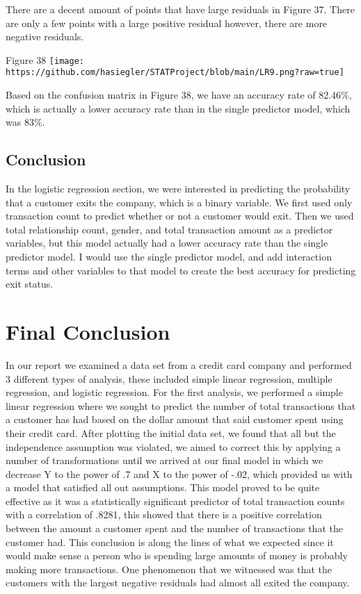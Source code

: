 \documentclass[
]{article}
\begin{document}
There are a decent amount of points that have large residuals in Figure
37. There are only a few points with a large positive residual however,
there are more negative residuals.

Figure 38
\texttt{[image: https://github.com/hasiegler/STATProject/blob/main/LR9.png?raw=true]}

Based on the confusion matrix in Figure 38, we have an accuracy rate of
82.46\%, which is actually a lower accuracy rate than in the single
predictor model, which was 83\%.

\hypertarget{conclusion-2}{%
\subsection{Conclusion}\label{conclusion-2}}

In the logistic regression section, we were interested in predicting the
probability that a customer exits the company, which is a binary
variable. We first used only transaction count to predict whether or not
a customer would exit. Then we used total relationship count, gender,
and total transaction amount as a predictor variables, but this model
actually had a lower accuracy rate than the single predictor model. I
would use the single predictor model, and add interaction terms and
other variables to that model to create the best accuracy for predicting
exit status.

\hypertarget{final-conclusion}{%
\section{Final Conclusion}\label{final-conclusion}}

In our report we examined a data set from a credit card company and
performed 3 different types of analysis, these included simple linear
regression, multiple regression, and logistic regression. For the first
analysis, we performed a simple linear regression where we sought to
predict the number of total transactions that a customer has had based
on the dollar amount that said customer spent using their credit card.
After plotting the initial data set, we found that all but the
independence assumption was violated, we aimed to correct this by
applying a number of transformations until we arrived at our final model
in which we decrease Y to the power of .7 and X to the power of -.02,
which provided us with a model that satisfied all out assumptions. This
model proved to be quite effective as it was a statistically significant
predictor of total transaction counts with a correlation of .8281, this
showed that there is a positive correlation between the amount a
customer spent and the number of transactions that the customer had.
This conclusion is along the lines of what we expected since it would
make sense a person who is spending large amounts of money is probably
making more transactions. One phenomenon that we witnessed was that the
customers with the largest negative residuals had almost all exited the
company.
\end{document}
